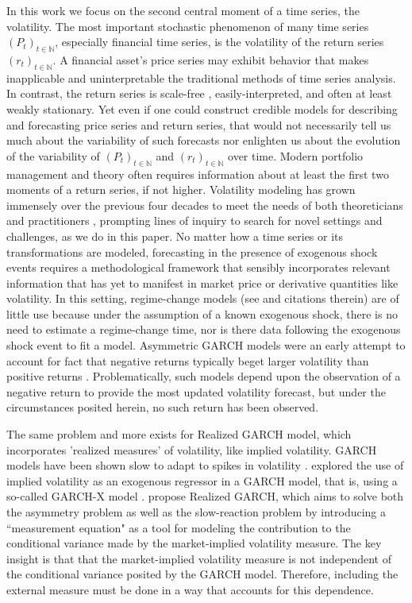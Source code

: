 \documentclass[11pt]{article}
\theoremstyle{definition}
\begin{document}
In this work we focus on the second central moment of a time series, the volatility.  The most important stochastic phenomenon of many time series $(P_{t})_{t\in\mathbb{N}}$, especially financial time series, is the volatility of the return series $(r_{t})_{t\in\mathbb{N}}$.  A financial asset's price series may exhibit behavior that makes inapplicable and uninterpretable the traditional methods of time series analysis.  In contrast, the return series is scale-free \citep{tsay2005analysis}, easily-interpreted, and often at least weakly stationary.  Yet even if one could construct credible models for describing and forecasting price series and return series, that would not necessarily tell us much about the variability of such forecasts nor enlighten us about the evolution of the variability of $(P_{t})_{t\in\mathbb{N}}$ and $(r_{t})_{t\in\mathbb{N}}$ over time. Modern portfolio management and theory often requires information about at least the first two moments of a return series, if not higher.  Volatility modeling has grown immensely over the previous four decades to meet the needs of both theoreticians and practitioners \citep{engle2001good}, prompting lines of inquiry to search for novel settings and challenges, as we do in this paper.  No matter how a time series or its transformations are modeled, forecasting in the presence of exogenous shock events requires a methodological framework that sensibly incorporates relevant information that has yet to manifest in market price or derivative quantities like volatility.  In this setting, regime-change models (see \citet{bauwens2006regime} and citations therein) are of little use because under the assumption of a known exogenous shock, there is no need to estimate a regime-change time, nor is there data following the exogenous shock event to fit a model.  Asymmetric GARCH models were an early attempt to account for fact that negative returns typically beget larger volatility than positive returns \citep{hansen2012realized}.  Problematically, such models depend upon the observation of a negative return to provide the most updated volatility forecast, but under the circumstances posited herein, no such return has been observed.

The same problem and more exists for Realized GARCH model, which incorporates 'realized measures' of volatility, like implied volatility.  GARCH models have been shown slow to adapt to spikes in volatility \citep{andersen2003modeling}.  \citet{engle2002new} explored the use of implied volatility as an exogenous regressor in a GARCH model, that is, using a so-called GARCH-X model \citep{RePEc:pra:mprapa:100301}. \citet{hansen2012realized} propose Realized GARCH, which aims to solve both the asymmetry problem as well as the slow-reaction problem by introducing a ``measurement equation" as a tool for modeling the contribution to the conditional variance made by the market-implied volatility measure.  The key insight is that that the market-implied volatility measure is not independent of the conditional variance posited by the GARCH model.  Therefore, including the external measure must be done in a way that accounts for this dependence. 
\end{document}
